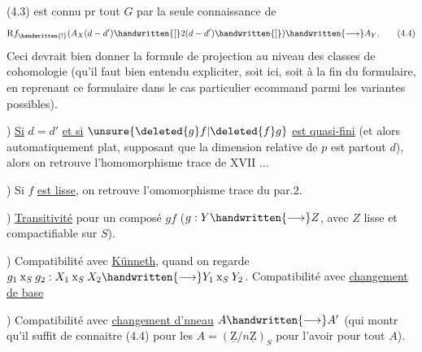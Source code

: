 
(4.3) est connu p\textsuperscript{\handwritten{\unsure{/}}}r tout $G$ par la seule connaissance de
\[
\mathrm{R}f_{\handwritten{!}}(A_X(d-d')\handwritten{[}2(d-d')\handwritten{]})\handwritten{\longrightarrow}A_Y.
\tag*{(4.4)}
\]
Ceci devrait bien donner la formule de projection au niveau des classes de cohomologie (qu'il faut bien entendu expliciter, soit ici, soit à la fin du formulaire, en reprenant ce formulaire dans  le cas particulier ecommand\handwritten{,} parmi les variantes possibles).

) \uline{Si} $d=d'$ \uline{et si} $\unsure{\deleted{g}f|\deleted{f}g}$ \uline{est quasi-fini} (et alors automatiquement plat, supposant que la dimension relative de $p$ est partout $d$), alors on retrouve l'homomorphisme trace de XVII ...

) Si $f$ \uline{est lisse}, on retrouve l'omomorphisme trace du par.2.

) \uline{Transitivité} pour un composé $gf$ ($g:Y\handwritten{\longrightarrow}Z$, avec $Z$ lisse et compactifiable sur $S$).

) Compatibilité avec \uline{Künneth}, quand on regarde $g_1\mathbin{\mathrm{x}}_S g_2:X_1\mathbin{\mathrm{x}}_S X_2\handwritten{\longrightarrow}Y_1\mathbin{\mathrm{x}}_S Y_2$. Compatibilité avec \uline{changement de base}

) Compatibilité avec \uline{changement d'nneau} $A\handwritten{\longrightarrow}A'$ (qui montr qu'il suffit de connaitre (4.4) pour les $A=(\underline{\mathrm{Z}}/n\underline{\mathrm{Z}})_S$ pour l'avoir pour tout $A$).

